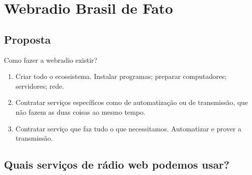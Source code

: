 \section{Webradio Brasil de Fato}\label{webradio-brasil-de-fato}

\subsection{Proposta}\label{proposta}

\begin{frame}{Como fazer a webradio existir?}

\begin{enumerate}
\def\labelenumi{\arabic{enumi}.}
\tightlist
\item
  Criar todo o ecossistema. Instalar programas; preparar computadores;
  servidores; rede.
\item
  Contratar serviços específicos como de automatização ou de
  transmissão, que não fazem as duas coisas ao mesmo tempo.
\item
  Contratar serviço que faz tudo o que necessitamos. Automatizar e
  prover a transmissão.
\end{enumerate}

\end{frame}

\subsection{Quais serviços de rádio web podemos
usar?}\label{quais-serviuxe7os-de-ruxe1dio-web-podemos-usar}

